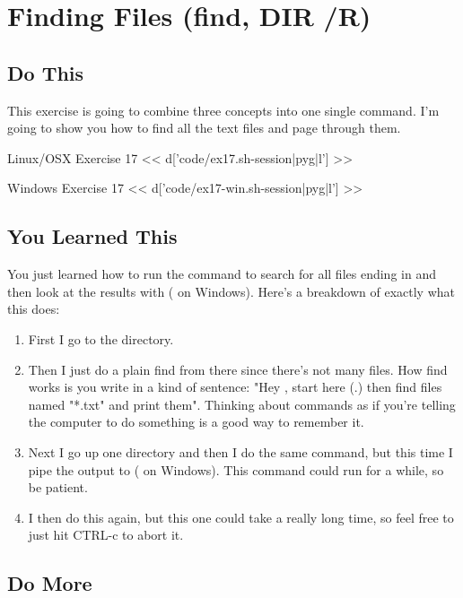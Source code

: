 \chapter{Finding Files (find, DIR /R)}

\section{Do This}

This exercise is going to combine three concepts into one single command.  I'm
going to show you how to find all the text files and page through them.

\begin{code}{Linux/OSX Exercise 17}
<< d['code/ex17.sh-session|pyg|l'] >>
\end{code}

\begin{code}{Windows Exercise 17}
<< d['code/ex17-win.sh-session|pyg|l'] >>
\end{code}

\section{You Learned This}

You just learned how to run the  command to search for all files
ending in  and then look at the results with  ( on Windows).  Here's a breakdown of exactly what this does:

\begin{enumerate}
\item First I go to the  directory.
\item Then I just do a plain find from there since there's not many 
files.  How find works is you write in a kind of sentence: "Hey ,
    start here (.) then find files named "*.txt" and print them".  Thinking
    about commands as if you're telling the computer to do something is a good
    way to remember it.
\item Next I go up one directory and then I do the same command, but this time I pipe the output to  ( on Windows).  This command could run for a while, so be patient.
\item I then do this again, but this one could take a really long time, so feel free to just hit CTRL-c to abort it.
\end{enumerate}


\section{Do More}

